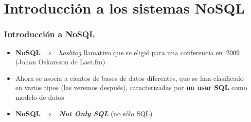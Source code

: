 \documentclass[14pt]{beamer}
\newcommand{\ra}{{\color{blue} $\Rightarrow${}~{}}}
\begin{document}
\section{Introducción a los sistemas NoSQL}

\begin{frame}
  \frametitle{Introducción a NoSQL}
\begin{itemize}
\item {\bf NoSQL} \ra{} {\em hashtag\/} llamativo que se
  eligió para una conferencia en~2009 (Johan Oskarsson de Last.fm)
\item Ahora se asocia a cientos de bases de datos diferentes,
  que se han clasificado en varios tipos (las veremos después),
  caracterizadas por {\bf no usar SQL} como modelo de datos
\item {\bf NoSQL} \ra{} {\bfseries\itshape Not Only SQL} (no sólo SQL)
  \end{itemize}
\end{frame}
\end{document}
